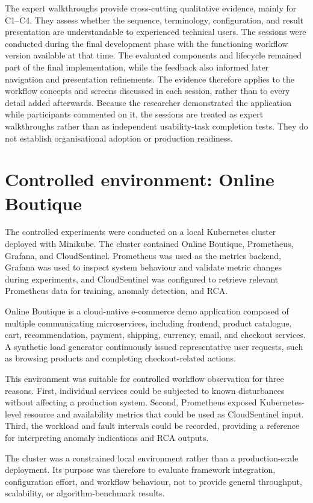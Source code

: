 The expert walkthroughs provide cross-cutting qualitative evidence, mainly for C1--C4. They assess whether the sequence, terminology, configuration, and result presentation are understandable to experienced technical users. The sessions were conducted during the final development phase with the functioning workflow version available at that time. The evaluated components and lifecycle remained part of the final implementation, while the feedback also informed later navigation and presentation refinements. The evidence therefore applies to the workflow concepts and screens discussed in each session, rather than to every detail added afterwards. Because the researcher demonstrated the application while participants commented on it, the sessions are treated as expert walkthroughs rather than as independent usability-task completion tests. They do not establish organisational adoption or production readiness.

\section{Controlled environment: Online Boutique}
The controlled experiments were conducted on a local Kubernetes cluster deployed with Minikube. The cluster contained Online Boutique, Prometheus, Grafana, and CloudSentinel. Prometheus was used as the metrics backend, Grafana was used to inspect system behaviour and validate metric changes during experiments, and CloudSentinel was configured to retrieve relevant Prometheus data for training, anomaly detection, and RCA.

Online Boutique is a cloud-native e-commerce demo application composed of multiple communicating microservices, including frontend, product catalogue, cart, recommendation, payment, shipping, currency, email, and checkout services. A synthetic load generator continuously issued representative user requests, such as browsing products and completing checkout-related actions.

This environment was suitable for controlled workflow observation for three reasons. First, individual services could be subjected to known disturbances without affecting a production system. Second, Prometheus exposed Kubernetes-level resource and availability metrics that could be used as CloudSentinel input. Third, the workload and fault intervals could be recorded, providing a reference for interpreting anomaly indications and RCA outputs.

The cluster was a constrained local environment rather than a production-scale deployment. Its purpose was therefore to evaluate framework integration, configuration effort, and workflow behaviour, not to provide general throughput, scalability, or algorithm-benchmark results.

